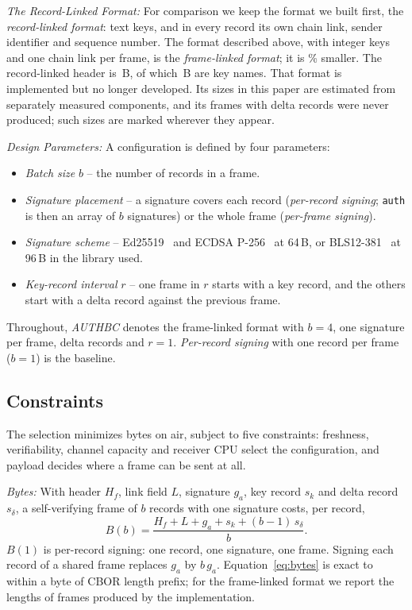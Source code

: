 \documentclass[lineno,pdflatex,sn-mathphys-num]{sn-jnl}
\newcommand{\ba}{\ensuremath{g_a}}
\newcommand{\runin}[1]{\textit{#1:}}
\renewcommand{\_}{\authbcunderscore\allowbreak}
\begin{document}
\runin{The Record-Linked Format} For comparison we keep the format we built first, the
\emph{record-linked format}: text keys, and in every record its own chain link, sender
identifier and sequence number. The format described above, with integer keys and one chain
link per frame, is the \emph{frame-linked format}; it is \leanVsFirstPct\% smaller. The
record-linked header is \hdrFirst\,B, of which \keyNamesFirst\,B are key names. That format is
implemented but no longer developed. Its sizes in this paper are estimated from separately
measured components, and its frames with delta records were never produced; such sizes are
marked wherever they appear.

\runin{Design Parameters} A configuration is defined by four parameters:
\begin{itemize}
\item \emph{Batch size} $b$ -- the number of records in a frame.
\item \emph{Signature placement} -- a signature covers each record (\emph{per-record signing};
\texttt{auth} is then an array of $b$ signatures) or the whole frame (\emph{per-frame signing}).
\item \emph{Signature scheme} -- Ed25519~\cite{ed25519} and ECDSA P-256~\cite{fips186} at 64\,B,
or BLS12-381~\cite{bls2001} at 96\,B in the library used.
\item \emph{Key-record interval} $r$ -- one frame in $r$ starts with a key record, and the
others start with a delta record against the previous frame.
\end{itemize}
Throughout, \emph{AUTHBC} denotes the frame-linked format with $b=4$, one signature per frame,
delta records and $r=1$. \emph{Per-record signing} with one record per frame ($b=1$) is the
baseline.

\subsection{Constraints}\label{sec:constraints}
The selection minimizes bytes on air, subject to five constraints: freshness, verifiability,
channel capacity and receiver CPU select the configuration, and payload decides where a frame can
be sent at all.

\runin{Bytes} With header $H_f$, link field $L$, signature \ba, key record $s_k$ and delta record
$s_\delta$, a self-verifying frame of $b$ records with one signature costs, per record,
\begin{equation}
B(b) = \frac{H_f + L + \ba + s_k + (b-1)\,s_\delta}{b}.
\label{eq:bytes}
\end{equation}
$B(1)$ is per-record signing: one record, one signature, one frame. Signing each record of a
shared frame replaces \ba{} by $b\,\ba$. Equation~\eqref{eq:bytes} is exact to within a byte of
CBOR length prefix; for the frame-linked format we report the lengths of frames produced by the
implementation.
\end{document}
